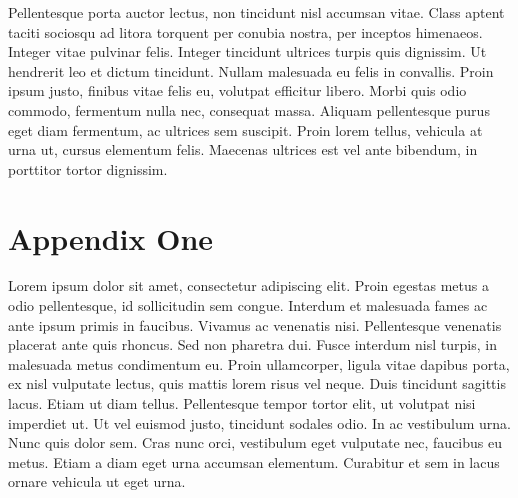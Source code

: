 \documentclass[12pt]{article}
\begin{document}
Pellentesque porta auctor lectus, non tincidunt nisl accumsan vitae. Class aptent taciti sociosqu ad litora torquent per conubia nostra, per inceptos himenaeos. Integer vitae pulvinar felis. Integer tincidunt ultrices turpis quis dignissim. Ut hendrerit leo et dictum tincidunt. Nullam malesuada eu felis in convallis. Proin ipsum justo, finibus vitae felis eu, volutpat efficitur libero. Morbi quis odio commodo, fermentum nulla nec, consequat massa. Aliquam pellentesque purus eget diam fermentum, ac ultrices sem suscipit. Proin lorem tellus, vehicula at urna ut, cursus elementum felis. Maecenas ultrices est vel ante bibendum, in porttitor tortor dignissim.




\clearpage
\begin{singlespace}
%
%


\end{singlespace}


\newpage
\appendix
\setcounter{table}{0}
\renewcommand{\tablename}{Appendix Table}
\renewcommand{\figurename}{Appendix Figure}
\renewcommand{\thetable}{A\arabic{table}}
\setcounter{figure}{0}
\renewcommand{\thefigure}{A\arabic{figure}}


\newpage 
\section{Appendix One \label{sec:appendix:first}}
\renewcommand{\thetable}{B\arabic{table}}
\setcounter{table}{0}
\renewcommand{\thefigure}{B\arabic{figure}}
\setcounter{figure}{0}

Lorem ipsum dolor sit amet, consectetur adipiscing elit. Proin egestas metus a odio pellentesque, id sollicitudin sem congue. Interdum et malesuada fames ac ante ipsum primis in faucibus. Vivamus ac venenatis nisi. Pellentesque venenatis placerat ante quis rhoncus. Sed non pharetra dui. Fusce interdum nisl turpis, in malesuada metus condimentum eu. Proin ullamcorper, ligula vitae dapibus porta, ex nisl vulputate lectus, quis mattis lorem risus vel neque. Duis tincidunt sagittis lacus. Etiam ut diam tellus. Pellentesque tempor tortor elit, ut volutpat nisi imperdiet ut. Ut vel euismod justo, tincidunt sodales odio. In ac vestibulum urna. Nunc quis dolor sem. Cras nunc orci, vestibulum eget vulputate nec, faucibus eu metus. Etiam a diam eget urna accumsan elementum. Curabitur et sem in lacus ornare vehicula ut eget urna.
\end{document}
